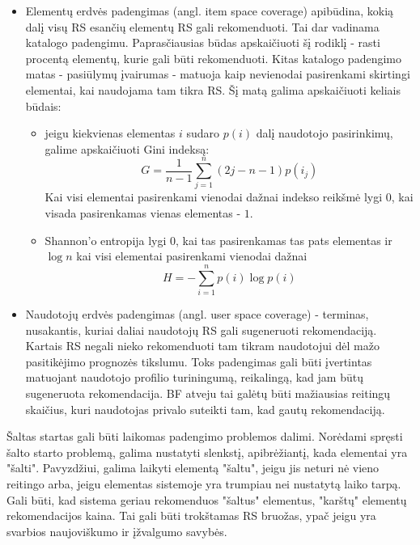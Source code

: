 \documentclass{VUMIFInfMagistrinis}
\begin{document}
\begin{itemize}
	\item Elementų erdvės padengimas (angl. item space coverage) apibūdina, kokią dalį visų RS esančių elementų RS gali rekomenduoti. Tai dar vadinama katalogo padengimu. Paprasčiausias būdas apskaičiuoti šį rodiklį - rasti procentą elementų, kurie gali būti rekomenduoti. Kitas katalogo padengimo matas - pasiūlymų įvairumas - matuoja kaip nevienodai pasirenkami skirtingi elementai, kai naudojama tam tikra RS. Šį matą galima apskaičiuoti keliais būdais:
	\begin{itemize}
	\item jeigu kiekvienas elementas $i$ sudaro $p(i)$ dalį naudotojo pasirinkimų, galime apskaičiuoti Gini indeksą:
	\begin{equation}
	G=\frac{1}{n-1} \sum\limits_{j=1}^{n} (2j-n-1)p(i_j)
	\end{equation}
	Kai visi elementai pasirenkami vienodai dažnai indekso reikšmė lygi $0$, kai visada pasirenkamas vienas elementas - $1$.
	\item Shannon'o entropija lygi 0, kai tas pasirenkamas tas pats elementas ir $\log n$ kai visi elementai pasirenkami vienodai dažnai
	\begin{equation}
	H= - \sum \limits_{i=1}^n p(i) \log p(i)
	\end{equation}
	\end{itemize}
	\item Naudotojų erdvės padengimas (angl. user space coverage) - terminas, nusakantis, kuriai daliai naudotojų RS gali sugeneruoti rekomendaciją. Kartais RS negali nieko rekomenduoti tam tikram naudotojui dėl mažo pasitikėjimo prognozės tikslumu. Toks padengimas gali būti įvertintas matuojant naudotojo profilio turiningumą, reikalingą, kad jam būtų sugeneruota rekomendacija. BF atveju tai galėtų būti mažiausias reitingų skaičius, kuri naudotojas privalo suteikti tam, kad gautų rekomendaciją.
\end{itemize}
Šaltas startas gali būti laikomas padengimo problemos dalimi. Norėdami spręsti šalto starto problemą, galima nustatyti slenkstį, apibrėžiantį, kada elementai yra "šalti". Pavyzdžiui, galima laikyti elementą "šaltu", jeigu jis neturi nė vieno reitingo arba, jeigu elementas sistemoje yra trumpiau nei nustatytą laiko tarpą.
\newline
\indent
Gali būti, kad sistema geriau rekomenduos "šaltus" elementus, "karštų" elementų rekomendacijos kaina. Tai gali būti trokštamas RS bruožas, ypač jeigu yra svarbios naujoviškumo ir įžvalgumo savybės.
\end{document}
